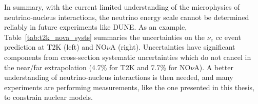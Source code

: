 In summary, with the current limited understanding of the microphysics of neutrino-nucleus interactions, the neutrino energy scale cannot be determined reliably in future experiments like DUNE. 
As an example, Table~\ref{tab:t2k_nova_systs} summaries the uncertainties on the $\nu_e$ \acrshort{cc} event prediction at T2K (left) and NO$\nu$A (right). Uncertainties have significant components from cross-section systematic uncertainties which do not cancel in the near/far extrapolation (4.7\% for T2K and 7.7\% for NO$\nu$A). A better understanding of neutrino-nucleus interactions is then needed, and many experiments are performing measurements, like the one presented in this thesis, to constrain nuclear models.





























































